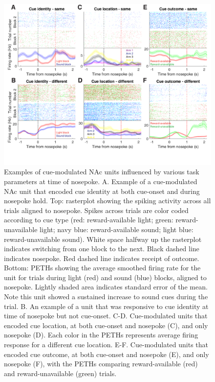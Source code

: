\documentclass[11pt]{article}
\begin{document}
\begin{figure}[h]
\centering
\includegraphics[width=\textwidth]{Fig 9 - NP Neural examples.png}
\caption{Examples of cue-modulated NAc units influenced by various task parameters at time of nosepoke. A. Example of a cue-modulated NAc unit that encoded cue identity at both cue-onset and during nosepoke hold. Top: rasterplot showing the spiking activity across all trials aligned to nosepoke. Spikes across trials are color coded according to cue type (red: reward-available light; green: reward-unavailable light; navy blue: reward-available sound; light blue: reward-unavailable sound). White space halfway up the rasterplot indicates switching from one block to the next. Black dashed line indicates nosepoke. Red dashed line indicates receipt of outcome. Bottom: PETHs showing the average smoothed firing rate for the unit for trials during light (red) and sound (blue) blocks, aligned to nosepoke. Lightly shaded area indicates standard error of the mean. Note this unit showed a sustained increase to sound cues during the trial. B. An example of a unit that was responsive to cue identity at time of nosepoke but not cue-onset. C-D. Cue-modulated units that encoded cue location, at both cue-onset and nosepoke (C), and only nosepoke (D). Each color in the PETHs represents average firing response for a different cue location. E-F. Cue-modulated units that encoded cue outcome, at both cue-onset and nosepoke (E), and only nosepoke (F), with the PETHs comparing reward-available (red) and reward-unavailable (green) trials.}
\label{fig:NP_examples}
\end{figure}
\end{document}
